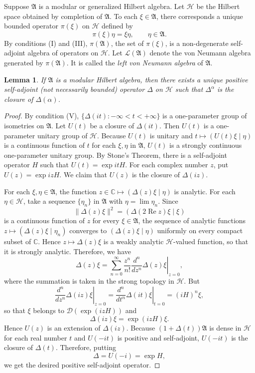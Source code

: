 \documentclass[12pt,b5paper,twoside]{article}
\theoremstyle{takesaki}
\newtheorem{lemma}{Lemma}[section]
\numberwithin{equation}{section}
\begin{document}
Suppose $\mathfrak A$ is a modular or generalized Hilbert algebra.  Let
$\mathcal H$ be the Hilbert space obtained by completion of
$\mathfrak A$.  To each $\xi\in\mathfrak A$, there corresponds a unique
bounded operator $\pi(\xi)$ on $\mathcal H$ defined by
\[
  \pi(\xi)\eta=\xi\eta,\qquad \eta\in\mathfrak A.
\]
By conditions (I) and (III), $\pi(\mathfrak A)$, the set of $\pi(\xi)$,
is a non-degenerate self-adjoint algebra of operators on $\mathcal H$.
Let $\mathcal L(\mathfrak A)$ denote the von Neumann algebra generated by
$\pi(\mathfrak A)$.  It is called the \emph{left von Neumann algebra} of
$\mathfrak A$.

\begin{lemma}\label{lem:2.1}
If $\mathfrak A$ is a modular Hilbert algebra, then there exists a unique
positive self-adjoint (not necessarily bounded) operator $\Delta$ on
$\mathcal H$ such that $\Delta^\alpha$ is the closure of
$\Delta(\alpha)$.
\end{lemma}

\begin{proof}
By condition (V), $\{\Delta(it):-\infty<t<+\infty\}$ is a one-parameter
group of isometries on $\mathfrak A$.  Let $U(t)$ be a closure of
$\Delta(it)$.  Then $U(t)$ is a one-parameter unitary group of
$\mathcal H$.  Because $U(t)$ is unitary and
$t\mapsto(U(t)\xi\mid\eta)$ is a continuous function of $t$ for each
$\xi,\eta$ in $\mathfrak A$, $U(t)$ is a strongly continuous
one-parameter unitary group.  By Stone's Theorem, there is a
self-adjoint operator $H$ such that $U(t)=\exp itH$.  For each complex
number $z$, put $U(z)=\exp izH$.  We claim that $U(z)$ is the closure of
$\Delta(iz)$.

For each $\xi,\eta\in\mathfrak A$, the function
$z\in\mathbb C\mapsto(\Delta(z)\xi\mid\eta)$ is analytic.  For each
$\eta\in\mathcal H$, take a sequence $\{\eta_n\}$ in $\mathfrak A$ with
$\eta=\lim\eta_n$.  Since
\[
  \|\Delta(z)\xi\|^2
    =(\Delta(2\operatorname{Re}z)\xi\mid\xi)
\]
is a continuous function of $z$ for every $\xi\in\mathfrak A$, the
sequence of analytic functions
$z\mapsto(\Delta(z)\xi\mid\eta_n)$ converges to
$(\Delta(z)\xi\mid\eta)$ uniformly on every compact subset of
$\mathbb C$.  Hence $z\mapsto\Delta(z)\xi$ is a weakly analytic
$\mathcal H$-valued function, so that it is strongly analytic.
Therefore, we have
\[
  \Delta(z)\xi
    =\sum_{n=0}^{\infty}\frac{z^n}{n!}
      \left.\frac{d^n}{dz^n}\Delta(z)\xi\right|_{z=0},
\]
where the summation is taken in the strong topology in $\mathcal H$.
But
\[
  \left.\frac{d^n}{dz^n}\Delta(iz)\xi\right|_{z=0}
   =\left.\frac{d^n}{dt^n}\Delta(it)\xi\right|_{t=0}
   =(iH)^n\xi,
\]
so that $\xi$ belongs to $\mathcal D(\exp(izH))$ and
\[
  \Delta(iz)\xi=\exp(izH)\xi.
\]
Hence $U(z)$ is an extension of $\Delta(iz)$.  Because
$(1+\Delta(t))\mathfrak A$ is dense in $\mathcal H$ for each real number
$t$ and $U(-it)$ is positive and self-adjoint, $U(-it)$ is the closure
of $\Delta(t)$.  Therefore, putting
\[
  \Delta=U(-i)=\exp H,
\]
we get the desired positive self-adjoint operator.
\end{proof}
\end{document}
